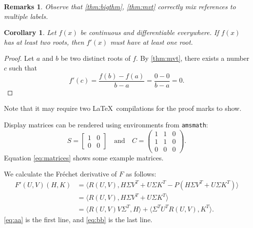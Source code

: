 \documentclass[openany,twoside,12pt]{book}
\theoremstyle{plain}
\newtheorem{corollary}{Corollary}[chapter]
\newtheorem{remark}{Remarks}[chapter]
\numberwithin{equation}{chapter}
\numberwithin{figure}{chapter}
\numberwithin{table}{chapter}
\begin{document}
\begin{remark}
Observe that \ref{thm:bigthm}, \ref{thm:mvt} correctly mix references
to multiple labels.
\end{remark}


\begin{corollary}\label{cor:a}
  Let $f(x)$ be continuous and differentiable everywhere. If $f(x)$
  has at least two roots, then $f'(x)$ must have at least one root.
\end{corollary}
\begin{proof}
  Let $a$ and $b$ be two distinct roots of $f$.
  By \ref{thm:mvt}, there exists a number $c$ such that
  \begin{equation*}
    f'(c) = \frac{f(b)-f(a)}{b-a} = \frac{0-0}{b-a} = 0.
  \end{equation*}
\end{proof}

Note that it may require two \LaTeX\ compilations for the proof marks
to show.

Display matrices can be rendered using environments from \texttt{amsmath}:
\begin{equation}\label{eq:matrices}
S=\begin{bmatrix}1&0\\0&0\end{bmatrix}
\quad\text{and}\quad
C=\begin{pmatrix}1&1&0\\1&1&0\\0&0&0\end{pmatrix}.
\end{equation}
Equation \ref{eq:matrices} shows some example matrices.

We calculate the Fr\'{e}chet derivative of $F$ as follows:
\begin{subequations}
\begin{align}
  F'(U,V)(H,K)
  &= \langle R(U,V),H\Sigma V^{T} + U\Sigma K^{T} -
  P(H\Sigma V^{T} + U\Sigma K^{T})\rangle \label{eq:aa} \\
  &= \langle R(U,V),H\Sigma V^{T} + U\Sigma K^{T}\rangle
  \nonumber \\
  &= \langle R(U,V)V\Sigma^{T},H\rangle +
  \langle \Sigma^{T}U^{T}R(U,V),K^{T}\rangle. \label{eq:bb}
\end{align}
\end{subequations}
\ref{eq:aa} is the first line, and \ref{eq:bb} is the last line.
\end{document}
